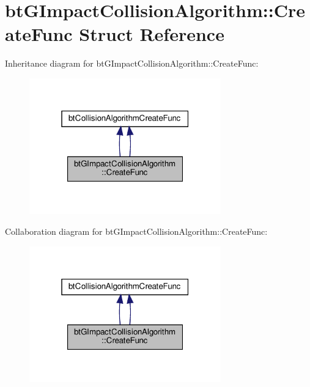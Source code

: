 \hypertarget{structbtGImpactCollisionAlgorithm_1_1CreateFunc}{}\section{bt\+G\+Impact\+Collision\+Algorithm\+:\+:Create\+Func Struct Reference}
\label{structbtGImpactCollisionAlgorithm_1_1CreateFunc}


Inheritance diagram for bt\+G\+Impact\+Collision\+Algorithm\+:\+:Create\+Func\+:
\nopagebreak
\begin{figure}[H]
\begin{center}
\leavevmode
\includegraphics[width=235pt]{structbtGImpactCollisionAlgorithm_1_1CreateFunc__inherit__graph}
\end{center}
\end{figure}


Collaboration diagram for bt\+G\+Impact\+Collision\+Algorithm\+:\+:Create\+Func\+:
\nopagebreak
\begin{figure}[H]
\begin{center}
\leavevmode
\includegraphics[width=235pt]{structbtGImpactCollisionAlgorithm_1_1CreateFunc__coll__graph}
\end{center}
\end{figure}
